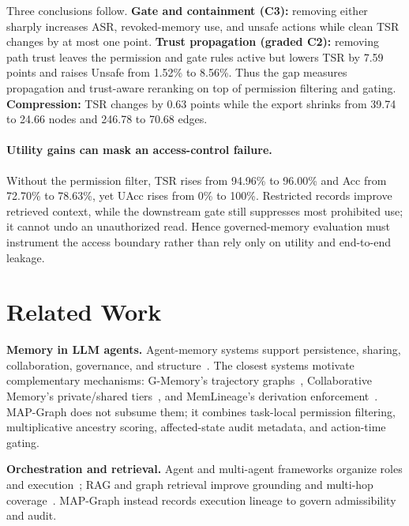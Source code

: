 \documentclass[letterpaper]{article} %
\begin{document}
Three conclusions follow. \textbf{Gate and containment (C3):} removing either sharply increases ASR, revoked-memory use, and unsafe actions while clean TSR changes by at most one point. \textbf{Trust propagation (graded C2):} removing path trust leaves the permission and gate rules active but lowers TSR by 7.59 points and raises Unsafe from 1.52\% to 8.56\%. Thus the gap measures propagation and trust-aware reranking on top of permission filtering and gating. \textbf{Compression:} TSR changes by 0.63 points while the export shrinks from 39.74 to 24.66 nodes and 246.78 to 70.68 edges.

\paragraph{Utility gains can mask an access-control failure.}
Without the permission filter, TSR rises from 94.96\% to 96.00\% and Acc from 72.70\% to 78.63\%, yet UAcc rises from 0\% to 100\%. Restricted records improve retrieved context, while the downstream gate still suppresses most prohibited use; it cannot undo an unauthorized read. Hence governed-memory evaluation must instrument the access boundary rather than rely only on utility and end-to-end leakage.

\section{Related Work}
\label{sec:related-work}

\noindent\textbf{Memory in LLM agents.} Agent-memory systems support persistence, sharing, collaboration, governance, and structure~\cite{packer2023memgpt,zhong2024memorybank,wang2023longmem,zhang2025memorysurvey,gao2024memorysharing,wang2025mirix,margalit2026governed}. The closest systems motivate complementary mechanisms: G-Memory's trajectory graphs~\cite{zhang2025gmemory}, Collaborative Memory's private/shared tiers~\cite{rezazadeh2025collaborativememory}, and MemLineage's derivation enforcement~\cite{ouyang2026memlineage}. MAP-Graph does not subsume them; it combines task-local permission filtering, multiplicative ancestry scoring, affected-state audit metadata, and action-time gating.

\smallskip
\noindent\textbf{Orchestration and retrieval.} Agent and multi-agent frameworks organize roles and execution~\cite{yao2023react,shinn2023reflexion,li2023camel,wu2024autogen,hong2024metagpt}; RAG and graph retrieval improve grounding and multi-hop coverage~\cite{lewis2020rag,guu2020realm,karpukhin2020dpr,edge2024graphrag,guo2025lightrag,gutierrez2024hipporag,qian2025memorag}. MAP-Graph instead records execution lineage to govern admissibility and audit.
\end{document}
